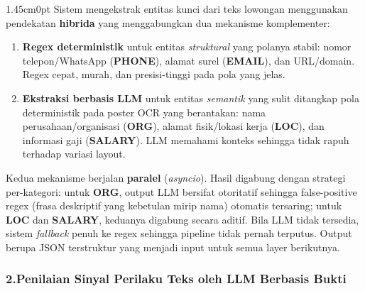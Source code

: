 \documentclass[12pt,a4paper]{article}
\begin{document}
\begin{adjustwidth}{1.45cm}{0pt}
\hspace*{0.85cm}Sistem mengekstrak entitas kunci dari teks lowongan menggunakan pendekatan \textbf{hibrida}
yang menggabungkan dua mekanisme komplementer:

\begin{enumerate}[label=\textbf{\alph*.}, labelindent=0pt, leftmargin=*]
\item \textbf{Regex deterministik} untuk entitas \emph{struktural} yang polanya stabil:
      nomor telepon/WhatsApp (\textbf{PHONE}), alamat surel (\textbf{EMAIL}), dan URL/domain.
      Regex cepat, murah, dan presisi-tinggi pada pola yang jelas.
\item \textbf{Ekstraksi berbasis LLM} untuk entitas \emph{semantik} yang sulit ditangkap pola
      deterministik pada poster OCR yang berantakan: nama perusahaan/organisasi (\textbf{ORG}),
      alamat fisik/lokasi kerja (\textbf{LOC}), dan informasi gaji (\textbf{SALARY}).
      LLM memahami konteks sehingga tidak rapuh terhadap variasi layout.
\end{enumerate}

Kedua mekanisme berjalan \textbf{paralel} (\textit{asyncio}). Hasil digabung dengan strategi per-kategori:
untuk \textbf{ORG}, output LLM bersifat otoritatif sehingga false-positive regex (frasa deskriptif
yang kebetulan mirip nama) otomatis tersaring; untuk \textbf{LOC} dan \textbf{SALARY}, keduanya
digabung secara aditif. Bila LLM tidak tersedia, sistem \emph{fallback} penuh ke regex sehingga
pipeline tidak pernah terputus. Output berupa JSON terstruktur yang menjadi input untuk semua
layer berikutnya.
\end{adjustwidth}

\subsubsection*{2.\quad Penilaian Sinyal Perilaku Teks oleh LLM Berbasis Bukti}
{}
\end{document}
